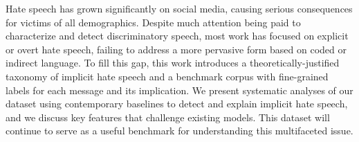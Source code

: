 Hate speech has grown significantly on social media, causing serious consequences for victims of all demographics. Despite much attention being paid to characterize and detect discriminatory speech, most work has focused on explicit or overt hate speech, failing to address a more pervasive form based on coded or indirect language. To fill this gap, this work introduces a theoretically-justified taxonomy of implicit hate speech and a benchmark corpus with fine-grained labels for each message and its implication. We present systematic analyses of our dataset using contemporary baselines to detect and explain implicit hate speech, and we discuss key features that challenge existing models. This dataset will continue to serve as a useful benchmark for understanding this multifaceted issue.
